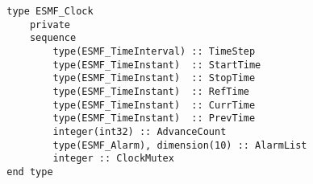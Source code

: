 \begin{verbatim}
        type ESMF_Clock
            private
            sequence
                type(ESMF_TimeInterval) :: TimeStep
                type(ESMF_TimeInstant)  :: StartTime
                type(ESMF_TimeInstant)  :: StopTime
                type(ESMF_TimeInstant)  :: RefTime
                type(ESMF_TimeInstant)  :: CurrTime
                type(ESMF_TimeInstant)  :: PrevTime
                integer(int32) :: AdvanceCount
                type(ESMF_Alarm), dimension(10) :: AlarmList
                integer :: ClockMutex
        end type
\end{verbatim}
